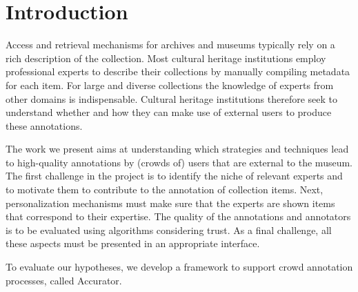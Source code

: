 \section{Introduction}\label{introduction}
Access and retrieval mechanisms for archives and museums typically rely on a rich description of the collection. 
Most cultural heritage institutions employ professional experts to describe their collections by manually compiling metadata for each item. 
For large and diverse collections the knowledge of experts from other domains is indispensable.
Cultural heritage institutions therefore seek to understand whether and how they can make use of external users to produce these annotations.

The work we present aims at understanding which strategies and techniques lead to high-quality annotations by (crowds of) users that are external to the museum. 
The first challenge in the project is to identify the niche of relevant experts and to motivate them to contribute to the annotation of collection items. 
Next, personalization mechanisms must make sure that the experts are shown items that correspond to their expertise. 
The quality of the annotations and annotators is to be evaluated using algorithms considering trust. As a final challenge, all these aspects must be presented in an appropriate interface.

To evaluate our hypotheses, we develop a framework to support crowd annotation processes, called Accurator. 